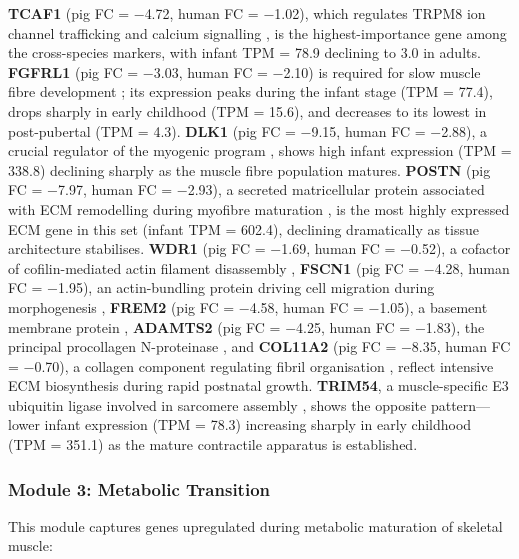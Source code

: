 \textbf{TCAF1} (pig FC = $-$4.72, human FC = $-$1.02), which regulates TRPM8 ion channel trafficking and calcium signalling \parencite{gkika_trp_2015}, is the highest-importance gene among the cross-species markers, with infant TPM = 78.9 declining to 3.0 in adults. \textbf{FGFRL1} (pig FC = $-$3.03, human FC = $-$2.10) is required for slow muscle fibre development \parencite{amann_fgfrl1_2014}; its expression peaks during the infant stage (TPM = 77.4), drops sharply in early childhood (TPM = 15.6), and decreases to its lowest in post-pubertal (TPM = 4.3). \textbf{DLK1} (pig FC = $-$9.15, human FC = $-$2.88), a crucial regulator of the myogenic program \parencite{waddell_dlk1_2010,andersen_dual_2013}, shows high infant expression (TPM = 338.8) declining sharply as the muscle fibre population matures. \textbf{POSTN} (pig FC = $-$7.97, human FC = $-$2.93), a secreted matricellular protein associated with ECM remodelling during myofibre maturation \parencite{ozdemir_periostin_2014}, is the most highly expressed ECM gene in this set (infant TPM = 602.4), declining dramatically as tissue architecture stabilises. \textbf{WDR1} (pig FC = $-$1.69, human FC = $-$0.52), a cofactor of cofilin-mediated actin filament disassembly \parencite{ono_functions_2018}, \textbf{FSCN1} (pig FC = $-$4.28, human FC = $-$1.95), an actin-bundling protein driving cell migration during morphogenesis \parencite{adams_roles_2004}, \textbf{FREM2} (pig FC = $-$4.58, human FC = $-$1.05), a basement membrane protein \parencite{kiyozumi_breakdown_2006}, \textbf{ADAMTS2} (pig FC = $-$4.25, human FC = $-$1.83), the principal procollagen N-proteinase \parencite{colige_cdna_1997}, and \textbf{COL11A2} (pig FC = $-$8.35, human FC = $-$0.70), a collagen component regulating fibril organisation \parencite{sun_collagen_2020}, reflect intensive ECM biosynthesis during rapid postnatal growth. \textbf{TRIM54}, a muscle-specific E3 ubiquitin ligase involved in sarcomere assembly \parencite{gregorio_functional_2005}, shows the opposite pattern---lower infant expression (TPM = 78.3) increasing sharply in early childhood (TPM = 351.1) as the mature contractile apparatus is established.

\subsubsection{Module 3: Metabolic Transition}

This module captures genes upregulated during metabolic maturation of skeletal muscle:

